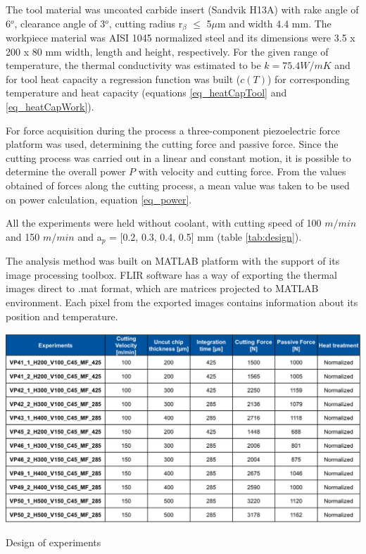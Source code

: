 		The tool material was uncoated carbide insert (Sandvik H13A) with rake angle of 6$^{o}$, clearance angle of 3$^{o}$, cutting radius r$_{\beta}$ $\le$ 5$\mu$m and width 4.4 mm. The workpiece material was AISI 1045 normalized steel and its dimensions were 3.5 x 200 x 80 mm width, length and height, respectively. For the given range of temperature, the thermal conductivity was estimated to be $k = 75.4 W/mK$ and for tool heat capacity a regression function was built ($c(T)$) for corresponding temperature and heat capacity (equations \ref{eq_heatCapTool} and \ref{eq_heatCapWork}).
	
		For force acquisition during the process a three-component piezoelectric force platform was used, determining the cutting force and passive force. Since the cutting process was carried out in a linear and constant motion, it is possible to determine the overall power $P$ with velocity and cutting force. From the values obtained of forces along the cutting process, a mean value was taken to be used on power calculation, equation \ref{eq_power}. 
	
		All the experiments were held without coolant, with cutting speed of 100 $m/min$ and 150 $m/min$ and a$_{p}$ = [0.2, 0.3, 0.4, 0.5] mm (table \ref{tab:design}).

		The analysis method was built on MATLAB platform with the support of its image processing toolbox. FLIR software has a way of exporting the thermal images direct to .mat format, which are matrices projected to MATLAB environment. Each pixel from the exported images contains information about its position and temperature.

		\begin{table}[H]
			\centering
			\captionsetup{justification=centering}
			\includegraphics[scale = 0.6]{Cap3/tabexpset.png}
			\caption{Design of experiments \cite{augspurger2016experimental}}
			\label{tab:design}
		\end{table}

